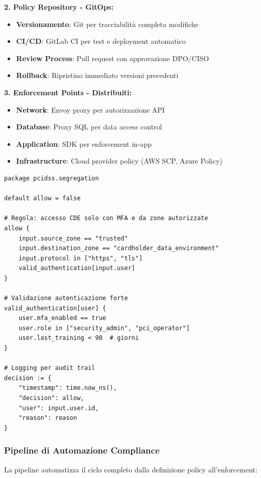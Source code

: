 \textbf{2. Policy Repository - GitOps:}
\begin{itemize}
    \item \textbf{Versionamento}: Git per tracciabilità completa modifiche
    \item \textbf{CI/CD}: GitLab CI per test e deployment automatico
    \item \textbf{Review Process}: Pull request con approvazione DPO/CISO
    \item \textbf{Rollback}: Ripristino immediato versioni precedenti
\end{itemize}

\textbf{3. Enforcement Points - Distribuiti:}
\begin{itemize}
    \item \textbf{Network}: Envoy proxy per autorizzazione API
    \item \textbf{Database}: Proxy SQL per data access control
    \item \textbf{Application}: SDK per enforcement in-app
    \item \textbf{Infrastructure}: Cloud provider policy (AWS SCP, Azure Policy)
\end{itemize}

\begin{lstlisting}[caption={Policy Rego per Segregazione Dati PCI},label={lst:rego_pci}]
package pcidss.segregation

default allow = false

# Regola: accesso CDE solo con MFA e da zone autorizzate
allow {
    input.source_zone == "trusted"
    input.destination_zone == "cardholder_data_environment"
    input.protocol in ["https", "tls"]
    valid_authentication[input.user]
}

# Validazione autenticazione forte
valid_authentication[user] {
    user.mfa_enabled == true
    user.role in ["security_admin", "pci_operator"]
    user.last_training < 90  # giorni
}

# Logging per audit trail
decision := {
    "timestamp": time.now_ns(),
    "decision": allow,
    "user": input.user.id,
    "reason": reason
}
\end{lstlisting}

\subsubsection{Pipeline di Automazione Compliance}

La pipeline automatizza il ciclo completo dalla definizione policy all'enforcement:

